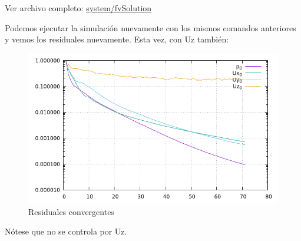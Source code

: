 \documentclass{article}
\begin{document}
\noindent Ver archivo completo: \href{https://github.com/guillerolle/casos_cfd/blob/master/02/system/fvSolution}{system/fvSolution}

\newpage
Podemos ejecutar la simulación nuevamente con los mismos comandos anteriores y vemos los residuales nuevamente. Esta vez, con Uz también:

\begin{figure}[h!]
	\centering
	\includegraphics[width=1\textwidth]{Figuras/04_residuales_siconv.png}
	\caption{Residuales convergentes}
	\label{fig:resid_siconv}
\end{figure}

Nótese que no se controla por Uz.
\end{document}
